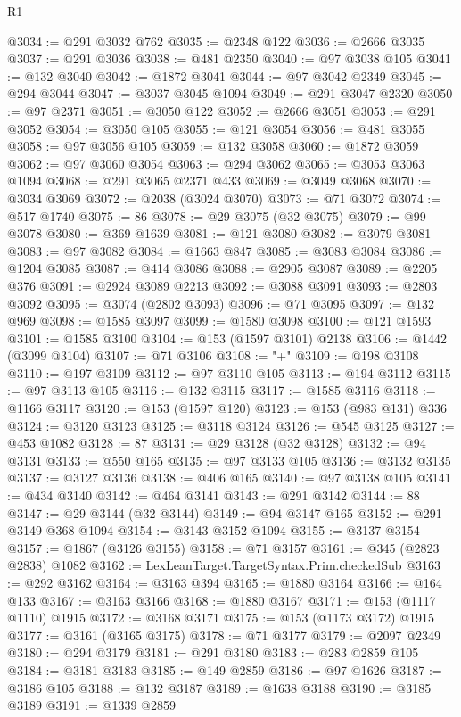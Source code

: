 \begin{lexlean}{R1}
\begin{coremodule}
@3034 := @291 @3032 @762
@3035 := @2348 @122
@3036 := @2666 @3035
@3037 := @291 @3036
@3038 := @481 @2350
@3040 := @97 @3038 @105
@3041 := @132 @3040
@3042 := @1872 @3041
@3044 := @97 @3042 @2349
@3045 := @294 @3044
@3047 := @3037 @3045 @1094
@3049 := @291 @3047 @2320
@3050 := @97 @2371
@3051 := @3050 @122
@3052 := @2666 @3051
@3053 := @291 @3052
@3054 := @3050 @105
@3055 := @121 @3054
@3056 := @481 @3055
@3058 := @97 @3056 @105
@3059 := @132 @3058
@3060 := @1872 @3059
@3062 := @97 @3060 @3054
@3063 := @294 @3062
@3065 := @3053 @3063 @1094
@3068 := @291 @3065 @2371 @433
@3069 := @3049 @3068
@3070 := @3034 @3069
@3072 := @2038 (@3024 @3070)
@3073 := @71 @3072
@3074 := @517 @1740
@3075 := 86
@3078 := @29 @3075 (@32 @3075)
@3079 := @99 @3078
@3080 := @369 @1639
@3081 := @121 @3080
@3082 := @3079 @3081
@3083 := @97 @3082
@3084 := @1663 @847
@3085 := @3083 @3084
@3086 := @1204 @3085
@3087 := @414 @3086
@3088 := @2905 @3087
@3089 := @2205 @376
@3091 := @2924 @3089 @2213
@3092 := @3088 @3091
@3093 := @2803 @3092
@3095 := @3074 (@2802 @3093)
@3096 := @71 @3095
@3097 := @132 @969
@3098 := @1585 @3097
@3099 := @1580 @3098
@3100 := @121 @1593
@3101 := @1585 @3100
@3104 := @153 (@1597 @3101) @2138
@3106 := @1442 (@3099 @3104)
@3107 := @71 @3106
@3108 := "+"
@3109 := @198 @3108
@3110 := @197 @3109
@3112 := @97 @3110 @105
@3113 := @194 @3112
@3115 := @97 @3113 @105
@3116 := @132 @3115
@3117 := @1585 @3116
@3118 := @1166 @3117
@3120 := @153 (@1597 @120)
@3123 := @153 (@983 @131) @336
@3124 := @3120 @3123
@3125 := @3118 @3124
@3126 := @545 @3125
@3127 := @453 @1082
@3128 := 87
@3131 := @29 @3128 (@32 @3128)
@3132 := @94 @3131
@3133 := @550 @165
@3135 := @97 @3133 @105
@3136 := @3132 @3135
@3137 := @3127 @3136
@3138 := @406 @165
@3140 := @97 @3138 @105
@3141 := @434 @3140
@3142 := @464 @3141
@3143 := @291 @3142
@3144 := 88
@3147 := @29 @3144 (@32 @3144)
@3149 := @94 @3147 @165
@3152 := @291 @3149 @368 @1094
@3154 := @3143 @3152 @1094
@3155 := @3137 @3154
@3157 := @1867 (@3126 @3155)
@3158 := @71 @3157
@3161 := @345 (@2823 @2838) @1082
@3162 := LexLeanTarget.TargetSyntax.Prim.checkedSub
@3163 := @292 @3162
@3164 := @3163 @394
@3165 := @1880 @3164
@3166 := @164 @133
@3167 := @3163 @3166
@3168 := @1880 @3167
@3171 := @153 (@1117 @1110) @1915
@3172 := @3168 @3171
@3175 := @153 (@1173 @3172) @1915
@3177 := @3161 (@3165 @3175)
@3178 := @71 @3177
@3179 := @2097 @2349
@3180 := @294 @3179
@3181 := @291 @3180
@3183 := @283 @2859 @105
@3184 := @3181 @3183
@3185 := @149 @2859
@3186 := @97 @1626
@3187 := @3186 @105
@3188 := @132 @3187
@3189 := @1638 @3188
@3190 := @3185 @3189
@3191 := @1339 @2859

\end{coremodule}
\end{lexlean}
